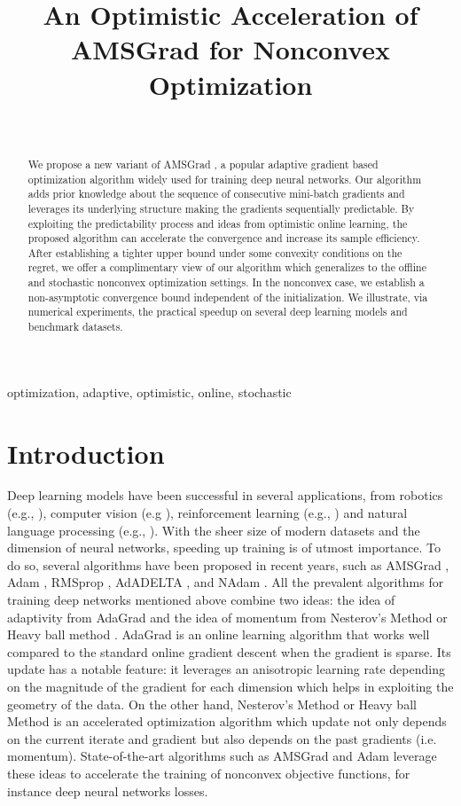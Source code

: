 \documentclass[wcp]{jmlr}
\title[OPT-AMS for Nonconvex Optimization]{An Optimistic Acceleration of AMSGrad for Nonconvex Optimization}
\author{\Name{Anonymous Authors} \Email{}\\
 }
\begin{document}
\maketitle

\begin{abstract}
We propose a new variant of AMSGrad \citep{RKK18}, a popular adaptive gradient based optimization algorithm widely used for training deep neural networks. 
Our algorithm adds prior knowledge about the sequence of consecutive mini-batch gradients and leverages its underlying structure making the gradients sequentially predictable. 
By exploiting the predictability process and ideas from optimistic online learning, the proposed algorithm can accelerate the convergence and increase its sample efficiency.
After establishing a tighter upper bound under some convexity conditions on the regret, we offer a complimentary view of our algorithm which generalizes to the offline and stochastic nonconvex optimization settings. 
In the nonconvex case, we establish a non-asymptotic convergence bound independent of the initialization.
We illustrate, via numerical experiments, the practical speedup on several deep learning models and benchmark datasets.

\end{abstract}
\begin{keywords}
optimization, adaptive, optimistic, online, stochastic
\end{keywords}

\section{Introduction}


Deep learning models have been successful in several applications, from robotics (e.g., \citep{LFDA17}), computer vision (e.g \citep{Rnet16,goodfellow2014generative}), reinforcement learning (e.g., \citep{Atari13}) and natural language processing (e.g., \citep{GMH13}).
With the sheer size of modern datasets and the dimension of neural networks, speeding up training is of utmost importance.
To do so, several algorithms have been proposed in recent years, such as  AMSGrad \citep{RKK18}, Adam \citep{KB15}, RMSprop \citep{TH12}, AdADELTA \citep{Z12}, and NAdam \citep{D16}.
All the prevalent algorithms for training deep networks mentioned above combine two ideas: the idea of adaptivity from AdaGrad \citep{DHS11,MS10} and the idea of momentum from Nesterov's Method \citep{N04} or Heavy ball method \citep{P64}.
AdaGrad is an online learning algorithm that works well compared to the standard online gradient descent when the gradient is sparse.
Its update has a notable feature: it leverages an anisotropic learning rate depending on the magnitude of the gradient for each dimension which helps in exploiting the geometry of the data. 
On the other hand, Nesterov's Method or Heavy ball Method \citep{P64} is an accelerated optimization algorithm which update not only depends on the current iterate and gradient but also depends on the past gradients (i.e. momentum). 
State-of-the-art algorithms such as AMSGrad \citep{RKK18} and Adam \citep{KB15} leverage these ideas to accelerate the training of nonconvex objective functions, for instance deep neural networks losses.
\end{document}
